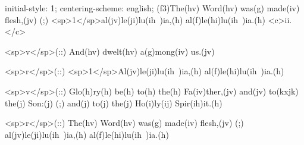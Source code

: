 initial-style: 1;
centering-scheme: english;
(f3)The(hv) Word(hv) was(g) made(iv) flesh,(jv) (;) <sp>1</sp>al(jv)le(ji)lu(ih~)ia,(h) al(f)le(hi)lu(ih~)ia.(h) <c>ii.</c>

<sp>v</sp>(::) And(hv) dwelt(hv) a(g)mong(iv) us.(jv)

<sp>r</sp>(::) <sp>1</sp>Al(jv)le(ji)lu(ih~)ia,(h) al(f)le(hi)lu(ih~)ia.(h)

<sp>v</sp>(::) Glo(h)ry(h) be(h) to(h) the(h) Fa(iv)ther,(jv) and(jv) to(kxjk) the(j) Son:(j) (;) and(j) to(j) the(j) Ho(i)ly(ij) Spir(ih)it.(h)

<sp>r</sp>(::) The(hv) Word(hv) was(g) made(iv) flesh,(jv) (;) al(jv)le(ji)lu(ih~)ia,(h) al(f)le(hi)lu(ih~)ia.(h)